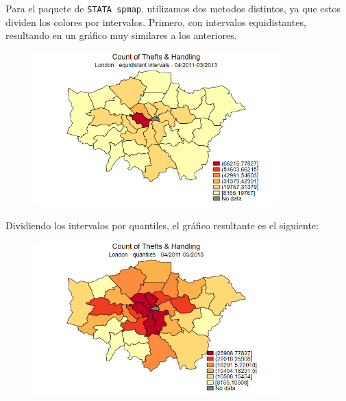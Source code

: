 \documentclass[9pt]{article}
\begin{document}
Para el paquete de \texttt{STATA spmap}, utilizamos dos metodos distintos, ya que estos dividen los colores por intervalos. Primero, con intervalos equidistantes, resultando en un gr\'afico muy similares a los anteriores. 
\begin{figure}[H]
    \centering
    \includegraphics[width=0.85\textwidth]{theftspequidistant.png}
\end{figure}
Dividiendo los intervalos por quantiles, el gr\'afico resultante es el siguiente:
\begin{figure}[H]
    \centering
    \includegraphics[width=0.85\textwidth]{theftspquantile.png}
\end{figure}
\end{document}
